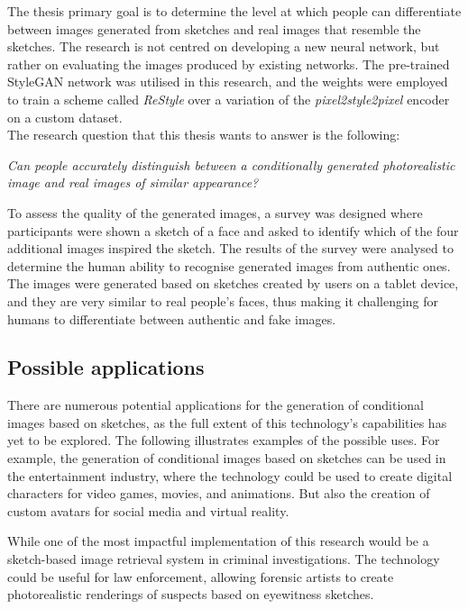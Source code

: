 \noindent The thesis primary goal is to determine the level at which people can differentiate between images generated from sketches and real images that resemble the sketches. The research is not centred on developing a new neural network, but rather on evaluating the images produced by existing networks. The pre-trained StyleGAN network was utilised in this research, and the weights were employed to train a scheme called \textit{ReStyle} over a variation of the \textit{pixel2style2pixel} encoder on a custom dataset. \\
The research question that this thesis wants to answer is the following:
\begin{center}
    \textit{Can people accurately distinguish between a conditionally generated photorealistic image and real images of similar appearance?}
\end{center}

\noindent To assess the quality of the generated images, a survey was designed where participants were shown a sketch of a face and asked to identify which of the four additional images inspired the sketch. The results of the survey were analysed to determine the human ability to recognise generated images from authentic ones.
The images were generated based on sketches created by users on a tablet device, and they are very similar to real people's faces, thus making it challenging for humans to differentiate between authentic and fake images.

\subsection{Possible applications}
There are numerous potential applications for the generation of conditional images based on sketches, as the full extent of this technology's capabilities has yet to be explored. The following illustrates examples of the possible uses. For example, the generation of conditional images based on sketches can be used in the entertainment industry, where the technology could be used to create digital characters for video games, movies, and animations. But also the creation of custom avatars for social media and virtual reality.

\noindent While one of the most impactful implementation of this research would be a sketch-based image retrieval system in criminal investigations. The technology could be useful for law enforcement, allowing forensic artists to create photorealistic renderings of suspects based on eyewitness sketches.

